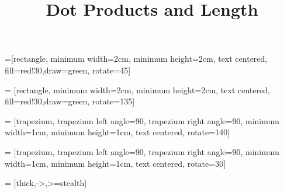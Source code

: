 \title{Dot Products and Length}
\subtitle{\SubTitleName}
\institute[]{\Course}
\author{\Instructor}
\maketitle   
  


 =[rectangle, minimum width=2cm, minimum height=2cm, text centered, fill=red!30,draw=green, rotate=45]

 = [rectangle, minimum width=2cm, minimum height=2cm, text centered, fill=red!30,draw=green, rotate=135]

 = [trapezium, trapezium left angle=90, trapezium right angle=90, minimum width=1cm, minimum height=1cm, text centered, rotate=140]

 = [trapezium, trapezium left angle=90, trapezium right angle=90, minimum width=1cm, minimum height=1cm, text centered, rotate=30]

 = [thick,->,>=stealth]








